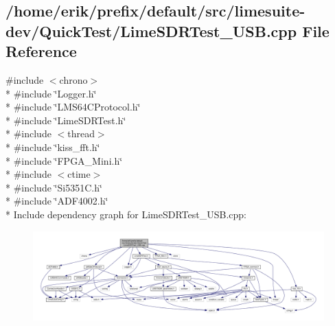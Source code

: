 \subsection{/home/erik/prefix/default/src/limesuite-\/dev/\+Quick\+Test/\+Lime\+S\+D\+R\+Test\+\_\+\+U\+SB.cpp File Reference}
\label{LimeSDRTest__USB_8cpp}
{\ttfamily \#include $<$chrono$>$}\\*
{\ttfamily \#include \char`\"{}Logger.\+h\char`\"{}}\\*
{\ttfamily \#include \char`\"{}L\+M\+S64\+C\+Protocol.\+h\char`\"{}}\\*
{\ttfamily \#include \char`\"{}Lime\+S\+D\+R\+Test.\+h\char`\"{}}\\*
{\ttfamily \#include $<$thread$>$}\\*
{\ttfamily \#include \char`\"{}kiss\+\_\+fft.\+h\char`\"{}}\\*
{\ttfamily \#include \char`\"{}F\+P\+G\+A\+\_\+\+Mini.\+h\char`\"{}}\\*
{\ttfamily \#include $<$ctime$>$}\\*
{\ttfamily \#include \char`\"{}Si5351\+C.\+h\char`\"{}}\\*
{\ttfamily \#include \char`\"{}A\+D\+F4002.\+h\char`\"{}}\\*
Include dependency graph for Lime\+S\+D\+R\+Test\+\_\+\+U\+S\+B.\+cpp\+:
\nopagebreak
\begin{figure}[H]
\begin{center}
\leavevmode
\includegraphics[width=350pt]{d2/dd2/LimeSDRTest__USB_8cpp__incl}
\end{center}
\end{figure}
